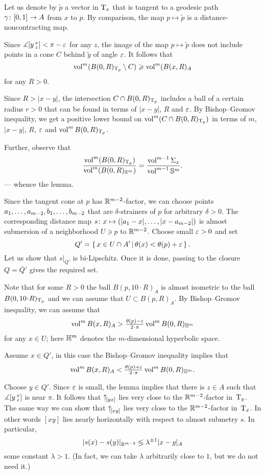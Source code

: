 Let us denote by $\tilde p$ a vector in $\mathrm{T}_x$ that is tangent to a geodesic path $\gamma\:[0,1]\zz\to A$ from $x$ to $p$.
By comparison, the map $p\mapsto \tilde p$ is a distance-noncontracting map.


Since $\measuredangle[y\,{}^{x}_{z}]<\pi-\varepsilon$ for any $z$, the image of the map $p\mapsto \tilde p$ does not include points in a cone $C$ behind $\tilde y$ of angle $\varepsilon$.
It follows that 
\[\operatorname{vol}^m(B(0,R)_{\mathrm{T}_p}\setminus C)\geqslant \operatorname{vol}^m(B(x,R)_A\]
for any $R>0$.

Since $R>|x-y|$, the intersection $C\zz\cap B(0,R)_{\T_p}$ includes a ball of a certain radius $r>0$ that can be found in terms of $|x-y|$, $R$ and $\varepsilon$.
By Bishop--Gromov inequality, we get a positive lower bound on $\operatorname{vol}^m(C\cap B(0,R)_{\mathrm{T}_p})$ in terms of $m$, $|x-y|$, $R$, $\varepsilon$ and $\operatorname{vol}^mB(0,R)_{\mathrm{T}_p}$.

Further, observe that 
\[\frac{\operatorname{vol}^m(B(0,R)_{\mathrm{T}_p})}{\operatorname{vol}^m(B(0,R)_{\mathbb{R}^m})}
=
\frac{\operatorname{vol}^{m-1} \Sigma_x}{\operatorname{vol}^{m-1} \mathbb{S}^m}.
\]
--- whence the lemma.
\qeds







Since the tangent cone at $p$ has $\mathbb{R}^{m-2}$-factor, 
we can choose points $a_1,\zz\dots,a_{m-2},b_1,\zz\dots,b_{m-2}$ that are $\delta$-strainers of $p$ for arbitrary $\delta>0$.
The corresponding distance map $s\:x\zz\mapsto (|a_1-x|,\zz\dots,|x-a_{m-2}|)$ is almost submersion of a neighborhood $U\ni p$ to $\mathbb{R}^{m-2}$.
Choose small $\varepsilon>0$ and set 
\[Q'=\left\{\,x\in U\cap A'\,\middle|\,\theta(x)<\theta(p)+\varepsilon\,\right\}.\]
Let us show that $s|_{Q'}$ is bi-Lipschitz.
Once it is done, passing to the closure $Q=\bar Q'$ gives the required set. 

Note that for some $R>0$ the ball $B(p,10\cdot R)_A$ is almost isometric to the ball $B(0,10\cdot R)_{\T_p}$
and we can assume that $U\subset B(p,R)_A$.
By Bishop--Gromov inequality, we can assume that 
\[\vol^m B(x,R)_A>\tfrac{\theta(p)-\eps}{2\cdot \pi}\vol^m B(0,R)_{\HH^m}\]
for any $x\in U$; here $\mathbb{H}^m$ denotes the $m$-dimensional hyperbolic space. 

Assume $x\in Q'$, in this case the Bishop--Gromov inequality implies that 
\[\vol^m B(x,R)_A< \tfrac{\theta(p)+\eps}{2\cdot \pi}\vol^m B(0,R)_{\HH^m}.\]

Choose $y\in Q'$.
Since $\varepsilon$ is small, the lemma implies that there is $z\in A$ such that $\measuredangle[y\,{}^{x}_{z}]$ is near $\pi$.
It follows that ${\uparrow}_{\hskip-0.15em[{y}{x}]}$ lies very close to the $\mathbb{R}^{m-2}$-factor in~$\mathrm{T}_y$.
The same way we can show that ${\uparrow}_{\hskip-0.15em[{x}{y}]}$ lies very close to the $\mathbb{R}^{m-2}$-factor in~$\mathrm{T}_x$.
In other words $[xy]$ lies nearly horizontally with respect to almost submetry $s$.
In particular,  
\[|s(x)-s(y)|_{\mathbb{R}^{m-2}} \lessgtr \lambda^{\pm1}|x-y|_{A}\]
some constant $\lambda>1$.
(In fact, we can take $\lambda$ arbitrarily close to $1$, but we do not need it.)
\qeds
